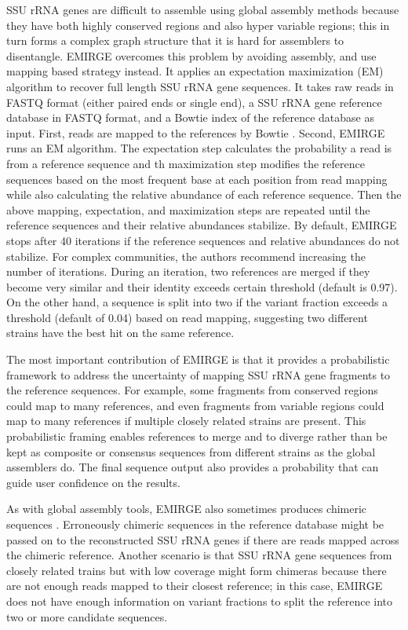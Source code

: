 \documentclass[]{msu-thesis}
\begin{document}
SSU rRNA genes are difficult to assemble using global assembly methods
because they have both highly conserved regions and also hyper variable
regions; this in turn forms a complex graph structure that it is hard
for assemblers to disentangle. EMIRGE overcomes this problem by
avoiding assembly, and use mapping based strategy instead. It applies
an expectation maximization (EM) algorithm to recover full length SSU
rRNA gene sequences. It takes raw reads in FASTQ format (either
paired ends or single end), a SSU rRNA gene reference database in
FASTQ format, and a Bowtie index of the reference database as
input. First, reads are mapped to the references by Bowtie
\cite{langmead_aligning_2010}. Second, EMIRGE runs an EM algorithm.
The expectation step
calculates the probability a read is from a reference sequence and th
maximization step modifies the reference sequences based on the most
frequent base at each position from read mapping while also calculating
the relative abundance of each reference sequence. Then the above
mapping, expectation, and maximization steps are repeated until the
reference sequences and their relative abundances stabilize. By
default, EMIRGE stops after 40 iterations if the reference sequences and
relative abundances do not stabilize. For complex communities, the authors
recommend increasing the number of iterations. During an iteration,
two references are merged if they become very similar and their
identity exceeds certain threshold (default is 0.97). On the other
hand, a sequence is split into two if the variant fraction exceeds a threshold (default of 0.04) based
on read mapping, suggesting two different strains have the best hit on
the same reference.

The most important contribution of EMIRGE is that it provides a
probabilistic framework to address the uncertainty of mapping SSU rRNA
gene fragments to the reference sequences. For example, some fragments
from conserved regions could map to many references, and even
fragments from variable regions could map to many references if
multiple closely related strains are present.
This probabilistic framing enables references
to merge and to diverge rather than be kept as composite or
consensus sequences from different strains as the global assemblers
do. The final sequence output also provides a probability that can guide
user confidence on the results.

As with global assembly tools, EMIRGE also sometimes produces chimeric
sequences 
\cite{rajeev_dynamic_2013}. Erroneously chimeric sequences in the reference
database might be passed on to the reconstructed SSU rRNA genes if there are
reads mapped across the chimeric reference. Another scenario is that
SSU rRNA gene sequences from closely related trains but with low
coverage might form chimeras because there are not enough reads mapped
to their closest reference; in this case, EMIRGE does not have enough
information on variant fractions to split the reference into two or more
candidate sequences.
\end{document}
